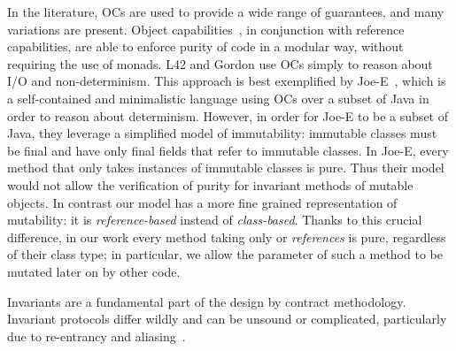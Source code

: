 In the literature, OCs are used to provide a wide range of guarantees, and many variations are present.
Object capabilities~\cite{RobustComposition}, in conjunction with reference capabilities, are able to
 enforce purity of code in a modular way, without requiring the use of monads.
L42 and Gordon use OCs simply to reason about I/O and non-determinism. This approach is best exemplified by Joe-E~\cite{finifter2008verifiable}, which is a self-contained and minimalistic language using OCs over a subset of Java in order to reason about determinism.
However, in order for Joe-E to be a subset of Java, they leverage a simplified model of immutability:
immutable classes must be final and have only final fields that refer to immutable classes.
In Joe-E, every method that only takes instances of immutable classes is pure.
Thus their model would not allow the verification of purity for invariant methods of mutable objects.
In contrast our model has a more fine grained representation of mutability: it is \emph{reference-based} instead of \emph{class-based}.
Thanks to this crucial difference, in our work every method taking only \Q@read@ or \Q@imm@ \emph{references} is pure, regardless of their class type; in particular, we allow the parameter of such a method to be mutated later on by other code.

Invariants are a fundamental part of the design by contract methodology. 
Invariant protocols differ wildly and can be unsound or complicated, particularly due to re-entrancy and aliasing~\cite{leino2004object,drossopoulou2008unified,meyer2016class}. 

